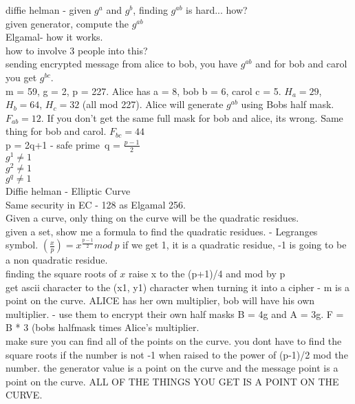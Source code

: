 \documentclass[12pt]{amsart}
\begin{document}
diffie helman - given $g^a$ and $g^b$, finding $g^{ab}$ is hard... how?\\
	given generator, compute the $g^{ab}$\\
	Elgamal- how it works.\\
	how to involve 3 people into this?\\
	sending encrypted message from alice to bob, you have $g^{ab}$ and for bob and carol you get $g^{bc}$.\\
	m = 59, g = 2, p = 227.  Alice has a = 8, bob b = 6, carol c = 5.  $H_a = 29$, $H_b = 64$, $H_c = 32$ (all mod 227).  Alice will generate $g^{ab}$ using Bobs half mask. $F_{ab} = 12$.  If you don't get the same full mask for bob and alice, its wrong.  Same thing for bob and carol.  $F_{bc} = 44$\\
	p = 2q+1 - safe prime\
	q = $\frac{p-1}{2}$\\
	$g^1 \neq 1$\\
	$g^2 \neq 1$\\
	$g^q \neq 1$\\
	
Diffie helman - Elliptic Curve\\
	Same security in EC - 128 as Elgamal 256.\\
	Given a curve, only thing on the curve will be the quadratic residues.\\
	given a set, show me a formula to find the quadratic residues. - Legranges symbol. $(\frac{x}{p}) = x ^{\frac{p-1}{2}} mod\ p$ if we get 1, it is a quadratic residue, -1 is going to be a non quadratic residue.\\
	finding the square roots of $x$ raise x to the (p+1)/4 and mod by p\\
	get ascii character to the (x1, y1) character when turning it into a cipher - m is a point on the curve.  ALICE has her own multiplier, bob will have his own multiplier. - use them to encrypt their own half masks B = 4g and A = 3g.  F = B * 3 (bobs halfmask times Alice's multiplier.\\
	make sure you can find all of the points on the curve. you dont have to find the square roots if the number is not -1 when raised to the power of (p-1)/2 mod the number.
	the generator value is a point on the curve and the message point is a point on the curve.  ALL OF THE THINGS YOU GET IS A POINT ON THE CURVE.
\end{document}
